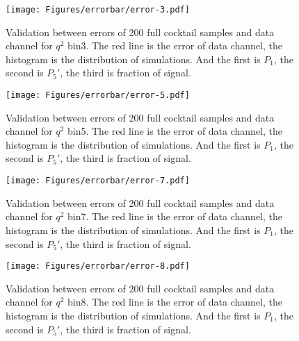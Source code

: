 \begin{figure}[!hbt]
  \centering
  \texttt{[image: Figures/errorbar/error-3.pdf]}
  \caption{Validation between errors of 200 full cocktail samples and
    data channel for $q^2$ bin3. The red line is the error of data
    channel, the histogram is the distribution of simulations. And the
    first is $P_1$, the second is $P_5'$, the third is fraction of
    signal.}
  \label{fig:error-com-3}
\end{figure}

\begin{figure}[!hbt]
  \centering
  \texttt{[image: Figures/errorbar/error-5.pdf]}
  \caption{Validation between errors of 200 full cocktail samples and
    data channel for $q^2$ bin5. The red line is the error of data
    channel, the histogram is the distribution of simulations. And the
    first is $P_1$, the second is $P_5'$, the third is fraction of
    signal.}
  \label{fig:error-com-5}
\end{figure}

\begin{figure}[!hbt]
  \centering
  \texttt{[image: Figures/errorbar/error-7.pdf]}
  \caption{Validation between errors of 200 full cocktail samples and
    data channel for $q^2$ bin7. The red line is the error of data
    channel, the histogram is the distribution of simulations. And the
    first is $P_1$, the second is $P_5'$, the third is fraction of
    signal.}
  \label{fig:error-com-7}
\end{figure}

\begin{figure}[!hbt]
  \centering
  \texttt{[image: Figures/errorbar/error-8.pdf]}
  \caption{Validation between errors of 200 full cocktail samples and
    data channel for $q^2$ bin8. The red line is the error of data
    channel, the histogram is the distribution of simulations. And the
    first is $P_1$, the second is $P_5'$, the third is fraction of
    signal.}
  \label{fig:error-com-8}
\end{figure}
